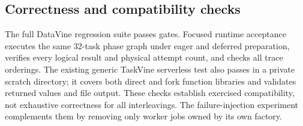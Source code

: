 \subsection{Correctness and compatibility checks}
The full DataVine regression suite passes \UpgradeRegressionPassed{} gates. Focused
runtime acceptance executes the same 32-task phase graph under eager and
deferred preparation, verifies every logical result and physical attempt
count, and checks all trace orderings. The existing generic TaskVine serverless
test also passes in a private scratch directory; it covers both direct and
fork function libraries and validates returned values and file output. These
checks establish exercised compatibility, not exhaustive correctness for all
interleavings. The failure-injection experiment complements them by removing
only worker jobs owned by its own factory.
